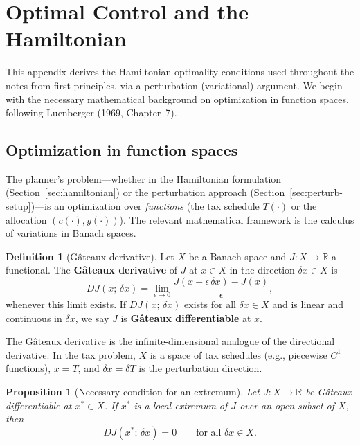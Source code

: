 \documentclass[12pt,a4paper]{article}
\theoremstyle{definition}
\newtheorem{definition}{Definition}[section]
\theoremstyle{plain}
\newtheorem{proposition}{Proposition}[section]
\theoremstyle{remark}
\newcommand{\R}{\mathbb{R}}
\begin{document}
\section{Optimal Control and the Hamiltonian}
\label{app:hamiltonian_primer}

This appendix derives the Hamiltonian optimality conditions used throughout the notes from first principles, via a perturbation (variational) argument. We begin with the necessary mathematical background on optimization in function spaces, following Luenberger (1969, Chapter~7).

\subsection{Optimization in function spaces}
\label{sec:functional_optimization}

The planner's problem---whether in the Hamiltonian formulation (Section~\ref{sec:hamiltonian}) or the perturbation approach (Section~\ref{sec:perturb-setup})---is an optimization over \emph{functions} (the tax schedule $T(\cdot)$ or the allocation $(c(\cdot), y(\cdot))$). The relevant mathematical framework is the calculus of variations in Banach spaces.

\begin{definition}[Gâteaux derivative]
\label{def:gateaux}
Let $X$ be a Banach space and $J: X \to \R$ a functional. The \textbf{Gâteaux derivative} of $J$ at $x \in X$ in the direction $\delta x \in X$ is
\[
  DJ(x;\, \delta x) = \lim_{\epsilon \to 0} \frac{J(x + \epsilon\,\delta x) - J(x)}{\epsilon},
\]
whenever this limit exists. If $DJ(x;\, \delta x)$ exists for all $\delta x \in X$ and is linear and continuous in $\delta x$, we say $J$ is \textbf{Gâteaux differentiable} at $x$.
\end{definition}

The Gâteaux derivative is the infinite-dimensional analogue of the directional derivative. In the tax problem, $X$ is a space of tax schedules (e.g., piecewise $C^1$ functions), $x = T$, and $\delta x = \delta T$ is the perturbation direction.

\begin{proposition}[Necessary condition for an extremum]
\label{prop:gateaux_necessary}
Let $J: X \to \R$ be Gâteaux differentiable at $x^* \in X$. If $x^*$ is a local extremum of $J$ over an open subset of $X$, then
\begin{equation}
\label{eq:gateaux_necessary}
  DJ(x^*;\, \delta x) = 0 \qquad \text{for all } \delta x \in X.
\end{equation}
\end{proposition}
\end{document}
